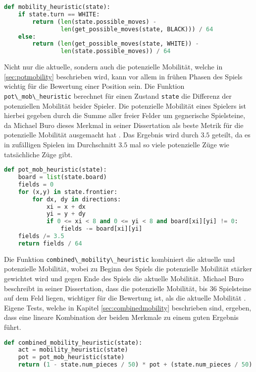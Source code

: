 \begin{lstlisting}[language=Python]
def mobility_heuristic(state):
    if state.turn == WHITE:
        return (len(state.possible_moves) -
                len(get_possible_moves(state, BLACK))) / 64
    else:
        return (len(get_possible_moves(state, WHITE)) -
                len(state.possible_moves)) / 64
\end{lstlisting}

Nicht nur die aktuelle, sondern auch die potenzielle Mobilität, welche
in \ref{sec:potmobility} beschrieben wird, kann vor allem in frühen
Phasen des Spiels wichtig für die Bewertung einer Position sein. Die
Funktion \passthrough{\lstinline!pot\_mob\_heuristic!} berechnet für
einen Zustand \passthrough{\lstinline!state!} die Differenz der
potenziellen Mobilität beider Spieler. Die potenzielle Mobilität eines
Spielers ist hierbei gegeben durch die Summe aller freier Felder um
gegnerische Spielsteine, da Michael Buro dieses Merkmal in seiner
Dissertation als beste Metrik für die potenzielle Mobilität ausgemacht
hat \cite[S. 9]{evaluationfunctions}. Das Ergebnis wird durch \(3.5\)
geteilt, da es in zufälligen Spielen im Durchschnitt \(3.5\) mal so
viele potenzielle Züge wie tatsächliche Züge gibt.

\begin{lstlisting}[language=Python]
def pot_mob_heuristic(state):
    board = list(state.board)
    fields = 0
    for (x,y) in state.frontier:
        for dx, dy in directions:
            xi = x + dx
            yi = y + dy
            if 0 <= xi < 8 and 0 <= yi < 8 and board[xi][yi] != 0:
                fields -= board[xi][yi]
    fields /= 3.5 
    return fields / 64
\end{lstlisting}

Die Funktion \passthrough{\lstinline!combined\_mobility\_heuristic!}
kombiniert die aktuelle und potenzielle Mobilität, wobei zu Beginn des
Spiels die potenzielle Mobilität stärker gewichtet wird und gegen Ende
des Spiels die aktuelle Mobilität. Michael Buro beschreibt in seiner
Dissertation, dass die potenzielle Mobilität, bis 36 Spielsteine auf dem
Feld liegen, wichtiger für die Bewertung ist, als die aktuelle Mobilität
\cite[S. 9]{evaluationfunctions}. Eigene Tests, welche in Kapitel
\ref{sec:combinedmobility} beschrieben sind, ergeben, dass eine lineare
Kombination der beiden Merkmale zu einem guten Ergebnis führt.

\begin{lstlisting}[language=Python]
def combined_mobility_heuristic(state):
    act = mobility_heuristic(state)
    pot = pot_mob_heuristic(state)
    return (1 - state.num_pieces / 50) * pot + (state.num_pieces / 50) *  act
\end{lstlisting}

